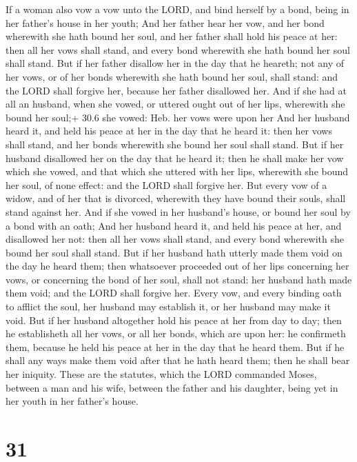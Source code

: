  If a woman also vow a vow unto the LORD, and bind herself
by a bond, being in her father's house in her youth;  And
her father hear her vow, and her bond wherewith she hath bound her soul,
and her father shall hold his peace at her: then all her vows shall
stand, and every bond wherewith she hath bound her soul shall stand.
 But if her father disallow her in the day that he heareth;
not any of her vows, or of her bonds wherewith she hath bound her soul,
shall stand: and the LORD shall forgive her, because her father
disallowed her.  And if she had at all an husband, when she
vowed, or uttered ought out of her lips, wherewith she bound her soul;+
30.6 she vowed: Heb. her vows were upon her  And her husband
heard it, and held his peace at her in the day that he heard it: then
her vows shall stand, and her bonds wherewith she bound her soul shall
stand.  But if her husband disallowed her on the day that he
heard it; then he shall make her vow which she vowed, and that which she
uttered with her lips, wherewith she bound her soul, of none effect: and
the LORD shall forgive her.  But every vow of a widow, and
of her that is divorced, wherewith they have bound their souls, shall
stand against her.  And if she vowed in her husband's
house, or bound her soul by a bond with an oath;  And her
husband heard it, and held his peace at her, and disallowed her not:
then all her vows shall stand, and every bond wherewith she bound her
soul shall stand.  But if her husband hath utterly made
them void on the day he heard them; then whatsoever proceeded out of her
lips concerning her vows, or concerning the bond of her soul, shall not
stand: her husband hath made them void; and the LORD shall forgive her.
 Every vow, and every binding oath to afflict the soul, her
husband may establish it, or her husband may make it void. 
But if her husband altogether hold his peace at her from day to day;
then he establisheth all her vows, or all her bonds, which are upon her:
he confirmeth them, because he held his peace at her in the day that he
heard them.  But if he shall any ways make them void after
that he hath heard them; then he shall bear her iniquity. 
These are the statutes, which the LORD commanded Moses, between a man
and his wife, between the father and his daughter, being yet in her
youth in her father's house.

\hypertarget{section-30}{%
\section{31}\label{section-30}}


